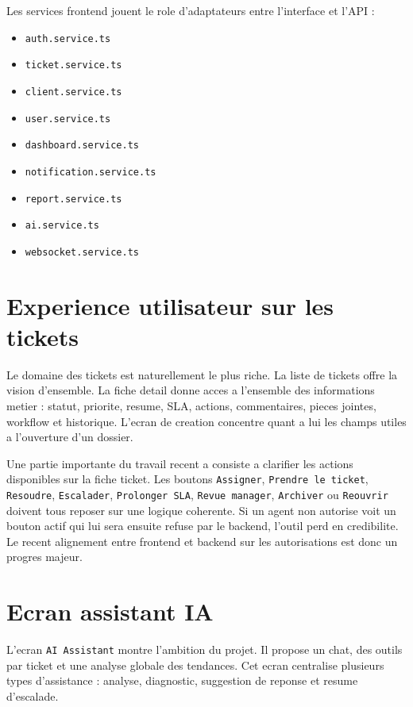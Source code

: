 \documentclass[12pt,a4paper,oneside]{report}
\begin{document}
Les services frontend jouent le role d'adaptateurs entre l'interface et l'API :

\begin{itemize}[leftmargin=1.2cm]
  \item \texttt{auth.service.ts}
  \item \texttt{ticket.service.ts}
  \item \texttt{client.service.ts}
  \item \texttt{user.service.ts}
  \item \texttt{dashboard.service.ts}
  \item \texttt{notification.service.ts}
  \item \texttt{report.service.ts}
  \item \texttt{ai.service.ts}
  \item \texttt{websocket.service.ts}
\end{itemize}

\section{Experience utilisateur sur les tickets}

Le domaine des tickets est naturellement le plus riche. La liste de tickets offre la vision d'ensemble. La fiche detail donne acces a l'ensemble des informations metier : statut, priorite, resume, SLA, actions, commentaires, pieces jointes, workflow et historique. L'ecran de creation concentre quant a lui les champs utiles a l'ouverture d'un dossier.

Une partie importante du travail recent a consiste a clarifier les actions disponibles sur la fiche ticket. Les boutons \texttt{Assigner}, \texttt{Prendre le ticket}, \texttt{Resoudre}, \texttt{Escalader}, \texttt{Prolonger SLA}, \texttt{Revue manager}, \texttt{Archiver} ou \texttt{Reouvrir} doivent tous reposer sur une logique coherente. Si un agent non autorise voit un bouton actif qui lui sera ensuite refuse par le backend, l'outil perd en credibilite. Le recent alignement entre frontend et backend sur les autorisations est donc un progres majeur.

\section{Ecran assistant IA}

L'ecran \texttt{AI Assistant} montre l'ambition du projet. Il propose un chat, des outils par ticket et une analyse globale des tendances. Cet ecran centralise plusieurs types d'assistance : analyse, diagnostic, suggestion de reponse et resume d'escalade.
\end{document}
